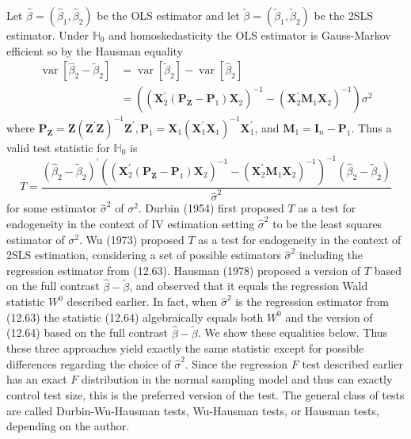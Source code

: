 \documentclass[10pt]{article}
\begin{document}
Let $\widehat{\beta}=\left(\widehat{\beta}_{1}, \widehat{\beta}_{2}\right)$ be the OLS estimator and let $\widetilde{\beta}=\left(\widetilde{\beta}_{1}, \widetilde{\beta}_{2}\right)$ be the 2SLS estimator. Under $\mathbb{H}_{0}$ and homoskedasticity the OLS estimator is Gauss-Markov efficient so by the Hausman equality
$$
\begin{aligned}
\operatorname{var}\left[\widehat{\beta}_{2}-\widetilde{\beta}_{2}\right] &=\operatorname{var}\left[\widetilde{\beta}_{2}\right]-\operatorname{var}\left[\widehat{\beta}_{2}\right] \\
&=\left(\left(\boldsymbol{X}_{2}^{\prime}\left(\boldsymbol{P}_{\boldsymbol{Z}}-\boldsymbol{P}_{1}\right) \boldsymbol{X}_{2}\right)^{-1}-\left(\boldsymbol{X}_{2}^{\prime} \boldsymbol{M}_{1} \boldsymbol{X}_{2}\right)^{-1}\right) \sigma^{2}
\end{aligned}
$$
where $\boldsymbol{P}_{\boldsymbol{Z}}=\boldsymbol{Z}\left(\boldsymbol{Z}^{\prime} \boldsymbol{Z}\right)^{-1} \boldsymbol{Z}^{\prime}, \boldsymbol{P}_{1}=\boldsymbol{X}_{1}\left(\boldsymbol{X}_{1}^{\prime} \boldsymbol{X}_{1}\right)^{-1} \boldsymbol{X}_{1}^{\prime}$, and $\boldsymbol{M}_{1}=\boldsymbol{I}_{n}-\boldsymbol{P}_{1}$. Thus a valid test statistic for $\mathbb{H}_{0}$ is
$$
T=\frac{\left(\widehat{\beta}_{2}-\widetilde{\beta}_{2}\right)^{\prime}\left(\left(\boldsymbol{X}_{2}^{\prime}\left(\boldsymbol{P}_{\boldsymbol{Z}}-\boldsymbol{P}_{1}\right) \boldsymbol{X}_{2}\right)^{-1}-\left(\boldsymbol{X}_{2}^{\prime} \boldsymbol{M}_{1} \boldsymbol{X}_{2}\right)^{-1}\right)^{-1}\left(\widehat{\beta}_{2}-\widetilde{\beta}_{2}\right)}{\widehat{\sigma}^{2}}
$$
for some estimator $\widehat{\sigma}^{2}$ of $\sigma^{2}$. Durbin (1954) first proposed $T$ as a test for endogeneity in the context of IV estimation setting $\widehat{\sigma}^{2}$ to be the least squares estimator of $\sigma^{2}$. Wu (1973) proposed $T$ as a test for endogeneity in the context of 2SLS estimation, considering a set of possible estimators $\widehat{\sigma}^{2}$ including the regression estimator from (12.63). Hausman (1978) proposed a version of $T$ based on the full contrast $\widehat{\beta}-\widetilde{\beta}$, and observed that it equals the regression Wald statistic $W^{0}$ described earlier. In fact, when $\widehat{\sigma}^{2}$ is the regression estimator from (12.63) the statistic (12.64) algebraically equals both $W^{0}$ and the version of (12.64) based on the full contrast $\widehat{\beta}-\widetilde{\beta}$. We show these equalities below. Thus these three approaches yield exactly the same statistic except for possible differences regarding the choice of $\widehat{\sigma}^{2}$. Since the regression $F$ test described earlier has an exact $F$ distribution in the normal sampling model and thus can exactly control test size, this is the preferred version of the test. The general class of tests are called Durbin-Wu-Hausman tests, Wu-Hausman tests, or Hausman tests, depending on the author.
\end{document}
